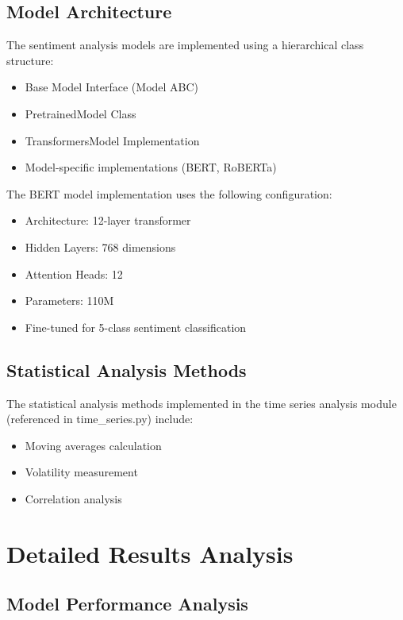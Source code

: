 \documentclass[12pt,a4paper]{report}
\begin{document}
\section{Model Architecture}
The sentiment analysis models are implemented using a hierarchical class
structure:

\begin{itemize}
    \item Base Model Interface (Model ABC)
    \item PretrainedModel Class
    \item TransformersModel Implementation
    \item Model-specific implementations (BERT, RoBERTa)
\end{itemize}

The BERT model implementation uses the following configuration:

\begin{itemize}
    \item Architecture: 12-layer transformer
    \item Hidden Layers: 768 dimensions
    \item Attention Heads: 12
    \item Parameters: 110M
    \item Fine-tuned for 5-class sentiment classification
\end{itemize}

\section{Statistical Analysis Methods}
The statistical analysis methods implemented in the time series analysis module
(referenced in time\_series.py) include:

\begin{itemize}
    \item Moving averages calculation
    \item Volatility measurement
    \item Correlation analysis
\end{itemize}

\chapter{Detailed Results Analysis}
\section{Model Performance Analysis}
\end{document}
